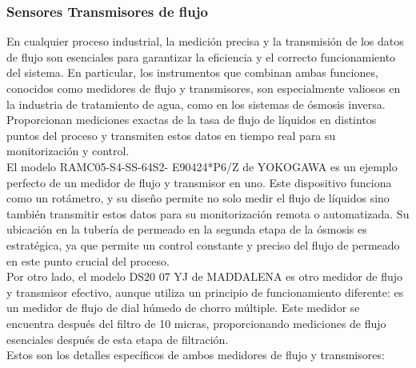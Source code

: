 \subsubsection{Sensores Transmisores de flujo}

En cualquier proceso industrial, la medición precisa y la transmisión de los datos de flujo son esenciales para garantizar la eficiencia y el correcto funcionamiento del sistema. En particular, los instrumentos que combinan ambas funciones, conocidos como medidores de flujo y transmisores, son especialmente valiosos en la industria de tratamiento de agua, como en los sistemas de ósmosis inversa. Proporcionan mediciones exactas de la tasa de flujo de líquidos en distintos puntos del proceso y transmiten estos datos en tiempo real para su monitorización y control.\\

El modelo RAMC05-S4-SS-64S2- E90424*P6/Z de YOKOGAWA es un ejemplo perfecto de un medidor de flujo y transmisor en uno. Este dispositivo funciona como un rotámetro, y su diseño permite no solo medir el flujo de líquidos sino también transmitir estos datos para su monitorización remota o automatizada. Su ubicación en la tubería de permeado en la segunda etapa de la ósmosis es estratégica, ya que permite un control constante y preciso del flujo de permeado en este punto crucial del proceso.\\

Por otro lado, el modelo DS20 07 YJ de MADDALENA es otro medidor de flujo y transmisor efectivo, aunque utiliza un principio de funcionamiento diferente: es un medidor de flujo de dial húmedo de chorro múltiple. Este medidor se encuentra después del filtro de 10 micras, proporcionando mediciones de flujo esenciales después de esta etapa de filtración.\\



Estos son los detalles específicos de ambos medidores de flujo y transmisores:\\



